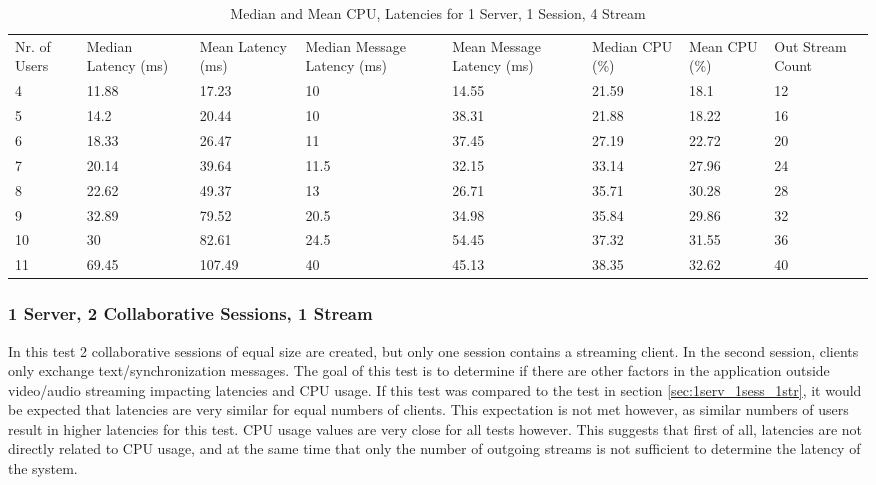 \begin{table}
\caption{Median and Mean CPU, Latencies for 1 Server, 1 Session, 4 Stream}
\label{table:1serv_1sess_4str}
\begin{tabu} to\linewidth{|X[c]|X[c]|X[c]|X[c]|X[c]|X[c]|X[c]|X[c]|}
\everyrow{\hline}
\hline
Nr. of Users & Median Latency (ms) & Mean Latency (ms) & Median Message Latency (ms) & Mean Message Latency (ms) & Median CPU (\%) & Mean CPU (\%) & Out Stream Count\\
4 & 11.88 & 17.23 & 10 & 14.55 & 21.59 & 18.1 & 12 \\
5 & 14.2 & 20.44 & 10 & 38.31 & 21.88 & 18.22 & 16 \\
6 & 18.33 & 26.47 & 11 & 37.45 & 27.19 & 22.72 & 20 \\
7 & 20.14 & 39.64 & 11.5 & 32.15 & 33.14 & 27.96 & 24 \\
8 & 22.62 & 49.37 & 13 & 26.71 & 35.71 & 30.28 & 28 \\
9 & 32.89 & 79.52 & 20.5 & 34.98 & 35.84 & 29.86 & 32 \\
10 & 30 & 82.61 & 24.5 & 54.45 & 37.32 & 31.55 & 36 \\
11 & 69.45 & 107.49 & 40 & 45.13 & 38.35 & 32.62 & 40 \\
\end{tabu}
\end{table}

\subsubsection{1 Server, 2 Collaborative Sessions, 1 Stream}
\label{sec:1serv_2sess_1str180}

In this test 2 collaborative sessions of equal size are created, but only one session contains a streaming client. In the second session, clients only exchange text/synchronization messages. The goal of this test is to determine if there are other factors in the application outside video/audio streaming impacting latencies and CPU usage. If this test was compared to the test in section \ref{sec:1serv_1sess_1str}, it would be expected that latencies are very similar for equal numbers of clients. This expectation is not met however, as similar numbers of users result in higher latencies for this test. CPU usage values are very close for all tests however. This suggests that first of all, latencies are not directly related to CPU usage, and at the same time that only the number of outgoing streams is not sufficient to determine the latency of the system.

